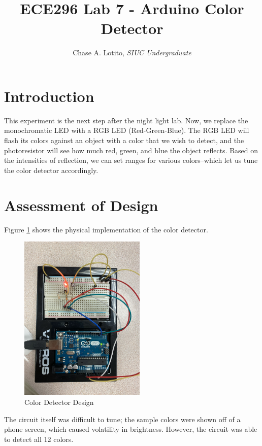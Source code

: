 \documentclass{IEEEtran}
\title{ECE296 Lab 7 - Arduino Color Detector}
\author{Chase A. Lotito, \textit{SIUC Undergraduate}}
\date{}
\begin{document}
\maketitle %

\section{Introduction} 

This experiment is the next step after the night light lab. Now, we replace the monochromatic LED with a RGB LED (Red-Green-Blue). The RGB LED will flash its colors against an object with a color that we wish to detect, and the photoresistor will see how much red, green, and blue the object reflects. Based on the intensities of reflection, we can set ranges for various colors--which let us tune the color detector accordingly.

\section{Assessment of Design}

Figure \ref{fig:design} shows the physical implementation of the color detector. 

\begin{figure}[!ht] 
    \centering
    \includegraphics[width = 6cm]{color-detector-physical.jpeg}
    \caption{Color Detector Design}
    \label{fig:design}
\end{figure}

The circuit itself was difficult to tune; the sample colors were shown off of a phone screen, which caused volatility in brightness. However, the circuit was able to detect all 12 colors. 
\end{document}
